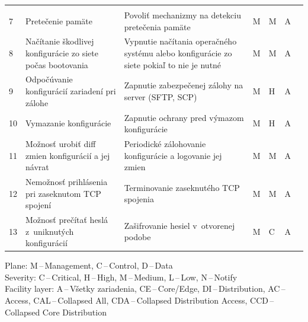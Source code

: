 \begin{longtable}[!htbp]{|C{2.5em}L{11em}L{11em}C{2.5em}C{4em}C{5em}L{2.5em}|}
	\cite{CIS_DrTLsgXv24lxeIIM}\\
	 7	&Pretečenie pamäte	&Povoliť mechanizmy na detekciu pretečenia pamäte	&M	&M	&A	& \cite{Singh2018}\\
	8	&Načítanie škodlivej konfigurácie zo siete počas bootovania	&Vypnutie načítania operačného systému alebo konfigurácie zo siete pokiaľ to nie je nutné	&M	&M	&A	& \cite{Akin2002}\\
	 9	&Odpočúvanie konfigurácií zariadení pri zálohe	&Zapnutie zabezpečenej zálohy na server (SFTP, SCP)	&M	&H	&A	& \cite{Singh2018}\\
	10	&Vymazanie konfigurácie	&Zapnutie ochrany pred výmazom konfigurácie	&M	&H	&A	& \cite{McMillan2018}\\
	 11	&Možnosť urobiť diff zmien konfigurácií a jej návrat	&Periodické zálohovanie konfigurácie a logovanie jej zmien	&M	&M	&A	& \cite{McMillan2018}
	
	\cite{Singh2018}\\
	12	&Nemožnosť prihlásenia pri zaseknutom TCP spojení	&Terminovanie zaseknutého TCP spojenia	&M	&M	&A	& \cite{Singh2018}\\
	 13	&Možnosť prečítať heslá z~uniknutých konfigurácií	&Zašifrovanie hesiel v~otvorenej podobe	&M	&C	&A	& \cite{CIS_DrTLsgXv24lxeIIM}\\
	
	\hline
\end{longtable}%
\vspace{-1em}
{\tiny 
	\noindent
	Plane: M\,--\,Management, C\,--\,Control, D\,--\,Data\\
	Severity: C\,--\,Critical, H\,--\,High, M\,--\,Medium, L\,--\,Low, N\,--\,Notify\\
	Facility layer: A\,--\,Všetky zariadenia, CE\,--\,Core/Edge, DI\,--\,Distribution, AC\,--\,Access, CAL\,--\,Collapsed All, CDA\,--\,Collapsed Distribution Access, CCD\,--\,Collapsed Core Distribution}









\restoregeometry 
\normalsize

